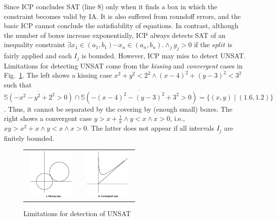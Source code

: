 \documentclass[runningheads,a4paper,oribibl]{llncs}
\begin{document}
Since ICP concludes SAT (line 8) only when it finds a box in which the constraint
becomes valid by IA. It is also suffered from roundoff errors, and 
the basic ICP cannot conclude the satisfiability of equations. 
In contrast, although the number of boxes increase exponentially,
ICP always detects SAT of an inequality constraint 
$\exists x_1 \in (a_1,b_1) \cdots x_n \in (a_n,b_n) . \wedge_{j} g_j > 0$
if the $split$ is fairly applied and each $I_j$ is bounded. 
However, ICP may miss to detect UNSAT.
Limitations for detecting UNSAT come from the \emph{kissing} and \emph{convergent} cases
in Fig.~\ref{fig:limit}.  The left shows a kissing case 
$x^2 + y^2 < 2^2 \wedge (x-4)^2 + (y-3)^2 < 3^2$ such that 
$\overline{\mathbb{S}(- x^2 - y^2 + 2^2 > 0)} \cap
 \overline{\mathbb{S}(- (x-4)^2 - (y-3)^2 + 3^2 > 0)} = \{(x,y) \mid (1.6, 1.2)\}$. 
Thus, it cannot be separated by the covering by (enough small) boxes. 
The right shows a convergent case 
$y > x + \frac{1}{x} \wedge y < x \wedge x > 0$,
i.e., $xy > x^2 + x \wedge y < x \wedge x > 0$.
The latter does not appear if all intervals $I_j$ are finitely bounded. 
\begin{figure}[ht]
\centering
\begin{tabular}{cc}
\includegraphics[height=1in,width=1.05in]{kissing.eps} &
\includegraphics[height=1in,width=1.05in]{convergence.eps}
\end{tabular}
\caption{Limitations for detection of UNSAT} 
\label{fig:limit} 
\end{figure} 
\end{document}
